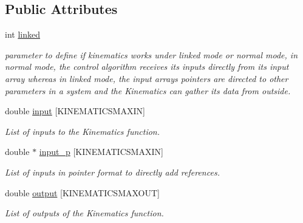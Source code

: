 \subsection*{Public Attributes}
\begin{DoxyCompactItemize}
\item 
\mbox{\label{struct_kinematcis___aebd619c051f3fd8718046a71979cf6fc}} 
int \hyperlink{struct_kinematcis___aebd619c051f3fd8718046a71979cf6fc}{linked}
\begin{DoxyCompactList}\small\item\em parameter to define if kinematics works under linked mode or normal mode, in normal mode, the control algorithm receives its inputs directly from its input array whereas in linked mode, the input array\textquotesingle{}s pointers are directed to other parameters in a system and the Kinematics can gather its data from outside. \end{DoxyCompactList}\item 
\mbox{\label{struct_kinematcis___a78e43c702e73cb1e9213773e0779fbb5}} 
double \hyperlink{struct_kinematcis___a78e43c702e73cb1e9213773e0779fbb5}{input} \mbox{[}K\+I\+N\+E\+M\+A\+T\+I\+C\+S\+M\+A\+X\+IN\mbox{]}
\begin{DoxyCompactList}\small\item\em List of inputs to the Kinematics function. \end{DoxyCompactList}\item 
\mbox{\label{struct_kinematcis___af671911d08035a464bd0cb9a1e88d14a}} 
double $\ast$ \hyperlink{struct_kinematcis___af671911d08035a464bd0cb9a1e88d14a}{input\+\_\+p} \mbox{[}K\+I\+N\+E\+M\+A\+T\+I\+C\+S\+M\+A\+X\+IN\mbox{]}
\begin{DoxyCompactList}\small\item\em List of inputs in pointer format to directly add references. \end{DoxyCompactList}\item 
\mbox{\label{struct_kinematcis___acc8bbbaf51a1c1d866a545f39c3d418e}} 
double \hyperlink{struct_kinematcis___acc8bbbaf51a1c1d866a545f39c3d418e}{output} \mbox{[}K\+I\+N\+E\+M\+A\+T\+I\+C\+S\+M\+A\+X\+O\+UT\mbox{]}
\begin{DoxyCompactList}\small\item\em List of outputs of the Kinematics function. \end{DoxyCompactList}\item 

\end{DoxyCompactItemize}
